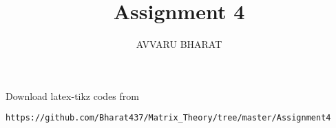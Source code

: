 \documentclass[journal,12pt,twocolumn]{IEEEtran}
\DeclareMathOperator*{\Res}{Res}
\begin{document}
\newtheorem{theorem}{Theorem}[section]
\newtheorem{problem}{Problem}
\newtheorem{proposition}{Proposition}[section]
\newtheorem{lemma}{Lemma}[section]
\newtheorem{corollary}[theorem]{Corollary}
\newtheorem{example}{Example}[section]
\newtheorem{definition}[problem]{Definition}

\newcommand{\BEQA}{\begin{eqnarray}}
\newcommand{\EEQA}{\end{eqnarray}}
\newcommand{\define}{\stackrel{\triangle}{=}}

\providecommand{\mbf}{\mathbf}
\providecommand{\pr}[1]{\ensuremath{\Pr\left(#1\right)}}
\providecommand{\qfunc}[1]{\ensuremath{Q\left(#1\right)}}
\providecommand{\sbrak}[1]{\ensuremath{{}\left[#1\right]}}
\providecommand{\lsbrak}[1]{\ensuremath{{}\left[#1\right.}}
\providecommand{\rsbrak}[1]{\ensuremath{{}\left.#1\right]}}
\providecommand{\brak}[1]{\ensuremath{\left(#1\right)}}
\providecommand{\lbrak}[1]{\ensuremath{\left(#1\right.}}
\providecommand{\rbrak}[1]{\ensuremath{\left.#1\right)}}
\providecommand{\cbrak}[1]{\ensuremath{\left\{#1\right\}}}
\providecommand{\lcbrak}[1]{\ensuremath{\left\{#1\right.}}
\providecommand{\rcbrak}[1]{\ensuremath{\left.#1\right\}}}
\theoremstyle{remark}
\newtheorem{rem}{Remark}
\newcommand{\sgn}{\mathop{\mathrm{sgn}}}
\providecommand{\abs}[1]{\left\vert#1\right\vert}
\providecommand{\res}[1]{\Res\displaylimits_{#1}} 
\providecommand{\norm}[1]{\left\lVert#1\right\rVert}
\providecommand{\mtx}[1]{\mathbf{#1}}
\providecommand{\mean}[1]{E\left[ #1 \right]}
\providecommand{\fourier}{\overset{\mathcal{F}}{ \rightleftharpoons}}
\providecommand{\system}{\overset{\mathcal{H}}{ \longleftrightarrow}}
\newcommand{\solution}{\noindent \textbf{Solution: }}
\newcommand{\cosec}{\,\text{cosec}\,}
\providecommand{\dec}[2]{\ensuremath{\overset{#1}{\underset{#2}{\gtrless}}}}
\newcommand{\myvec}[1]{\ensuremath{\begin{pmatrix}#1\end{pmatrix}}}
\newcommand{\mydet}[1]{\ensuremath{\begin{vmatrix}#1\end{vmatrix}}}
\makeatletter
{}
\makeatother
\let\StandardTheFigure\thefigure
\let\vec\mathbf
\renewcommand{\thefigure}{\theproblem}
\def\putbox#1#2#3{\makebox[0in][l]{\makebox[#1][l]{}\raisebox{\baselineskip}[0in][0in]{\raisebox{#2}[0in][0in]{#3}}}}
     \def\rightbox#1{\makebox[0in][r]{#1}}
     \def\centbox#1{\makebox[0in]{#1}}
     \def\topbox#1{\raisebox{-\baselineskip}[0in][0in]{#1}}
     \def\midbox#1{\raisebox{-0.5\baselineskip}[0in][0in]{#1}}
\vspace{3cm}
\title{Assignment 4}
\author{AVVARU BHARAT}
\maketitle
\newpage
\bigskip
\renewcommand{\thefigure}{\theenumi}
\renewcommand{\thetable}{\theenumi}
Download latex-tikz codes from 
%
\begin{lstlisting}
https://github.com/Bharat437/Matrix_Theory/tree/master/Assignment4
\end{lstlisting}
\end{document}
